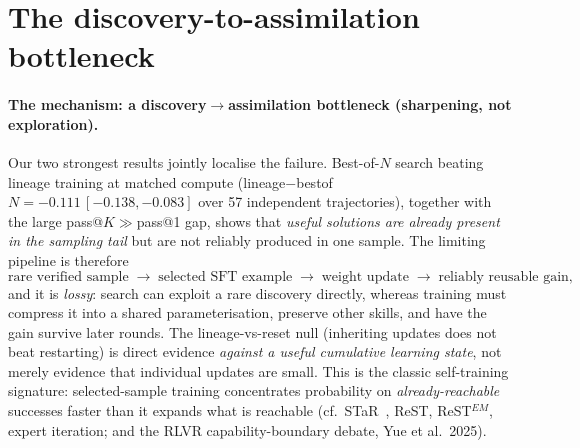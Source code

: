 \section{The discovery-to-assimilation bottleneck}

\paragraph{The mechanism: a discovery$\to$assimilation bottleneck (sharpening, not exploration).}
Our two strongest results jointly localise the failure. Best-of-$N$ search beating lineage training at matched
compute (lineage$-$bestof$N=-0.111\,[-0.138,-0.083]$ over 57 independent trajectories), together with the
large pass@$K\!\gg\!$pass@1 gap, shows
that \emph{useful solutions are already present in the sampling tail} but are not reliably produced in one
sample. The limiting pipeline is therefore
\[
\text{rare verified sample}\;\to\;\text{selected SFT example}\;\to\;\text{weight update}\;\to\;\text{reliably reusable gain},
\]
and it is \emph{lossy}: search can exploit a rare discovery directly, whereas training must compress it into a
shared parameterisation, preserve other skills, and have the gain survive later rounds. The lineage-vs-reset
null (inheriting updates does not beat restarting) is direct evidence \emph{against a useful cumulative learning
state}, not merely evidence that individual updates are small. This is the classic self-training signature:
selected-sample training concentrates probability on \emph{already-reachable} successes faster than it expands
what is reachable (cf.\ STaR~\cite{zelikman2022star}, ReST, ReST$^{EM}$, expert iteration; and the RLVR capability-boundary debate,
Yue et al.\ 2025).

